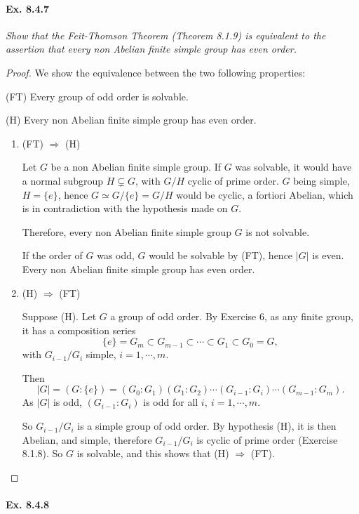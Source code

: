 \documentclass[11pt,a4paper]{article}
\newcommand{\be} {\begin{enumerate}}
\newcommand{\ee} {\end{enumerate}}
\begin{document}
\paragraph{Ex. 8.4.7}

{\it Show that the Feit-Thomson Theorem (Theorem 8.1.9) is equivalent to the assertion that every non Abelian finite simple group has even order.
}

\begin{proof}
We show the equivalence between the two following properties:

(FT)  Every group of odd order is solvable.

(H)  Every non Abelian finite simple group has even order.


\be
\item[(FT) $\Rightarrow$ (H)]

Let $G$ be a non Abelian finite simple group. If $G$ was solvable, it would have a normal subgroup $H \subsetneq G$, with $G/H$ cyclic of prime order. $G$ being simple, $H = \{e\}$, hence $G \simeq G/\{e\} = G/H$ would be cyclic, a fortiori Abelian, which is in contradiction with the hypothesis made on $G$.

Therefore, every non Abelian finite simple group $G$ is not solvable.

If the order of $G$ was odd, $G$ would be solvable by (FT), hence $\vert G \vert$ is even. Every non Abelian finite simple group has even order.



\item[(H) $\Rightarrow$ (FT)]

Suppose (H). Let $G$ a group of odd order. By Exercise 6, as any finite group, it has a composition series
$$\{e\} =G_m \subset G_{m-1}\subset \cdots \subset G_1 \subset G_0 = G,$$
with $G_{i-1}/G_i$ simple, $i=1,\cdots,m$.

Then
$$\vert G \vert = (G:\{e\}) = (G_0:G_1)(G_1:G_2)\cdots(G_{i-1} : G_i)\cdots (G_{m-1}:G_m).$$
As $\vert G \vert$ is odd, $(G_{i-1} : G_i)$ is odd for all $i,\ i=1,\cdots,m$.

So $G_{i-1}/G_i$ is a simple group of odd order. By hypothesis (H), it is then Abelian, and simple, therefore $G_{i-1}/G_i$ is cyclic of prime order (Exercise 8.1.8). So $G$ is solvable, and this shows that (H) $\Rightarrow$ (FT).
\ee
\end{proof}

\paragraph{Ex. 8.4.8}
\end{document}
